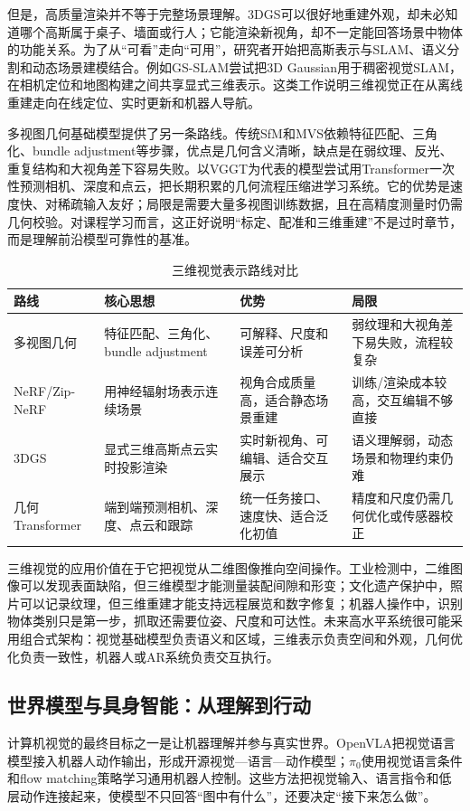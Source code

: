 \documentclass[UTF8,a4paper,12pt]{ctexart}
\newcommand{\model}[1]{\textsf{#1}}
\begin{document}
但是，高质量渲染并不等于完整场景理解。3DGS可以很好地重建外观，却未必知道哪个高斯属于桌子、墙面或行人；它能渲染新视角，却不一定能回答场景中物体的功能关系。为了从“可看”走向“可用”，研究者开始把高斯表示与SLAM、语义分割和动态场景建模结合。例如\model{GS-SLAM}尝试把3D Gaussian用于稠密视觉SLAM，在相机定位和地图构建之间共享显式三维表示\cite{gsslam}。这类工作说明三维视觉正在从离线重建走向在线定位、实时更新和机器人导航。

多视图几何基础模型提供了另一条路线。传统SfM和MVS依赖特征匹配、三角化、bundle adjustment等步骤，优点是几何含义清晰，缺点是在弱纹理、反光、重复结构和大视角差下容易失败。以\model{VGGT}为代表的模型尝试用Transformer一次性预测相机、深度和点云，把长期积累的几何流程压缩进学习系统。它的优势是速度快、对稀疏输入友好；局限是需要大量多视图训练数据，且在高精度测量时仍需几何校验。对课程学习而言，这正好说明“标定、配准和三维重建”不是过时章节，而是理解前沿模型可靠性的基准。

\begin{table}[htbp]
\centering
\small
\caption{三维视觉表示路线对比}
\begin{tabularx}{\textwidth}{C{2.4cm}Y Y Y}
\toprule
\textbf{路线} & \textbf{核心思想} & \textbf{优势} & \textbf{局限} \\
\midrule
多视图几何 & 特征匹配、三角化、bundle adjustment & 可解释、尺度和误差可分析 & 弱纹理和大视角差下易失败，流程较复杂 \\
NeRF/Zip-NeRF & 用神经辐射场表示连续场景 & 视角合成质量高，适合静态场景重建 & 训练/渲染成本较高，交互编辑不够直接 \\
3DGS & 显式三维高斯点云实时投影渲染 & 实时新视角、可编辑、适合交互展示 & 语义理解弱，动态场景和物理约束仍难 \\
几何Transformer & 端到端预测相机、深度、点云和跟踪 & 统一任务接口、速度快、适合泛化初值 & 精度和尺度仍需几何优化或传感器校正 \\
\bottomrule
\end{tabularx}
\end{table}

三维视觉的应用价值在于它把视觉从二维图像推向空间操作。工业检测中，二维图像可以发现表面缺陷，但三维模型才能测量装配间隙和形变；文化遗产保护中，照片可以记录纹理，但三维重建才能支持远程展览和数字修复；机器人操作中，识别物体类别只是第一步，抓取还需要位姿、尺度和可达性。未来高水平系统很可能采用组合式架构：视觉基础模型负责语义和区域，三维表示负责空间和外观，几何优化负责一致性，机器人或AR系统负责交互执行。

\subsection{世界模型与具身智能：从理解到行动}
计算机视觉的最终目标之一是让机器理解并参与真实世界。\model{OpenVLA}把视觉语言模型接入机器人动作输出，形成开源视觉—语言—动作模型\cite{openvla}；$\pi_0$使用视觉语言条件和flow matching策略学习通用机器人控制\cite{pi0}。这些方法把视觉输入、语言指令和低层动作连接起来，使模型不只回答“图中有什么”，还要决定“接下来怎么做”。
\end{document}
